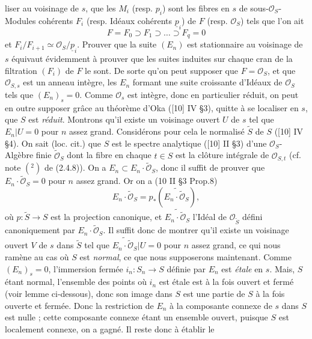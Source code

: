 liser au voisinage de $s$, que les $M_i$ (resp. $p_i$) sont les fibres en $s$ de sous-$\mathcal O_S$-Modules cohérents $F_i$ (resp. Idéaux cohérents $\underline{p}_i$) de $F$ (resp. $\mathcal O_S$) tels que l'on ait
\[
 F=F_0\supset F_1\supset\ldots\supset F_q=0
\]
et $F_i/F_{i+1}\simeq\mathcal O_S/\underline{p}_i$. Prouver que la suite $(E_n)$ est stationnaire au voisinage de $s$ équivaut évidemment à prouver que les suites induites sur chaque cran de la filtration $(F_i)$ de $F$ le sont. De sorte qu'on peut supposer que $F=\mathcal O_S$, et que $\mathcal O_{S,s}$ est un anneau intègre, les $E_n$ formant une suite croissante d'Idéaux de $\mathcal O_S$ tels que $(E_n)_s=0$. Comme $\mathcal O_s$ est intègre, donc en particulier réduit, on peut en outre supposer grâce au théorème d'Oka ([10] IV \S3), quitte à se localiser en $s$, que $S$ est \emph{réduit}. Montrons qu'il existe un voisinage ouvert $U$ de $s$ tel que $E_n|U=0$ pour $n$ assez grand. Considérons pour cela le normalisé $\widetilde S$ de $S$ ([10] IV \S4). On sait (loc. cit.) que $S$ est le spectre analytique ([10] II \S3) d'une $\mathcal O_S$-Algèbre finie $\widetilde{\mathcal O}_S$ dont la fibre en chaque $t\in S$ est la clôture intégrale de $\mathcal O_{S,t}$ (cf. note $(^2)$ de (2.4.8)). On a $E_n\subset E_n\cdot\widetilde{\mathcal O}_S$, donc il suffit de prouver que $E_n\cdot\widetilde{\mathcal O}_S=0$ pour $n$ assez grand. Or on a (10 II \S3 Prop.8)
\[
 E_n\cdot\widetilde{\mathcal O}_S = p_*(\widetilde{E_n\cdot\widetilde{\mathcal O}_S}),
\]
où $p:\widetilde S\longrightarrow S$ est la projection canonique, et $\widetilde{E_n\cdot\widetilde{\mathcal O}_S}$ l'Idéal de $\mathcal O_{\widetilde S}$ défini canoniquement par $E_n\cdot\widetilde{\mathcal O}_S$. Il suffit donc de montrer qu'il existe un voisinage ouvert $V$ de $s$ dans $\widetilde S$ tel que $\widetilde{E_n\cdot\widetilde{\mathcal O}_S}|U=0$ pour $n$ assez grand, ce qui nous ramène au cas où $S$ est \emph{normal}, ce que nous supposerons maintenant. Comme $(E_n)_s=0$, l'immersion fermée $i_n:S_n\longrightarrow S$ définie par $E_n$ est \emph{étale} en $s$. Mais, $S$ étant normal, l'ensemble des points où $i_n$ est étale est à la fois ouvert et fermé (voir lemme ci-dessous), donc son image dans $S$ est une partie de $S$ à la fois ouverte et fermée. Donc la restriction de $E_n$ à la composante connexe de $s$ dans $S$ est nulle ; cette composante connexe étant un ensemble ouvert, puisque $S$ est localement connexe, on a gagné. Il reste donc à établir le

